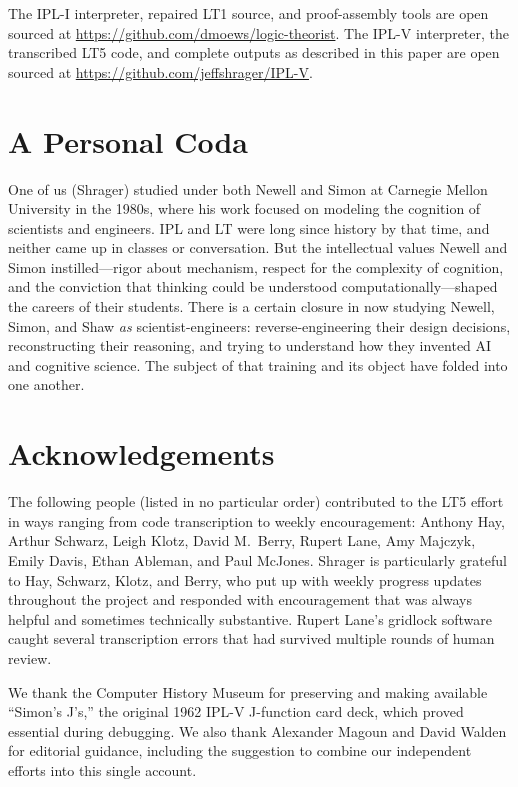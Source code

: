 \documentclass[journal]{IEEEtran}
\begin{document}
The IPL-I interpreter, repaired LT1 source, and proof-assembly tools
are open sourced at \url{https://github.com/dmoews/logic-theorist}.
The IPL-V interpreter, the transcribed LT5 code, and complete outputs
as described in this paper are open sourced at
\url{https://github.com/jeffshrager/IPL-V}.

\section*{A Personal Coda}

One of us (Shrager) studied under both Newell and Simon at Carnegie
Mellon University in the 1980s, where his work focused on modeling the
cognition of scientists and engineers. IPL and LT were long since
history by that time, and neither came up in classes or
conversation. But the intellectual values Newell and Simon
instilled---rigor about mechanism, respect for the complexity of
cognition, and the conviction that thinking could be understood
computationally---shaped the careers of their students. There is a
certain closure in now studying Newell, Simon, and Shaw \textit{as}
scientist-engineers: reverse-engineering their design decisions,
reconstructing their reasoning, and trying to understand how they
invented AI and cognitive science. The subject of that training and
its object have folded into one another.

\section*{Acknowledgements}


The following people (listed in no particular order) contributed to
the LT5 effort in ways ranging from code transcription to weekly
encouragement: Anthony Hay, Arthur Schwarz, Leigh Klotz, David
M.\ Berry, Rupert Lane, Amy Majczyk, Emily Davis, Ethan Ableman, and
Paul McJones. Shrager is particularly grateful to Hay, Schwarz, Klotz,
and Berry, who put up with weekly progress updates throughout the
project and responded with encouragement that was always helpful and
sometimes technically substantive. Rupert Lane's gridlock software
caught several transcription errors that had survived multiple rounds
of human review.

We thank the Computer History Museum for preserving and making
available ``Simon's J's,'' the original 1962 IPL-V J-function card
deck, which proved essential during debugging. We also thank Alexander
Magoun and David Walden for editorial guidance, including the
suggestion to combine our independent efforts into this single
account.
\end{document}
